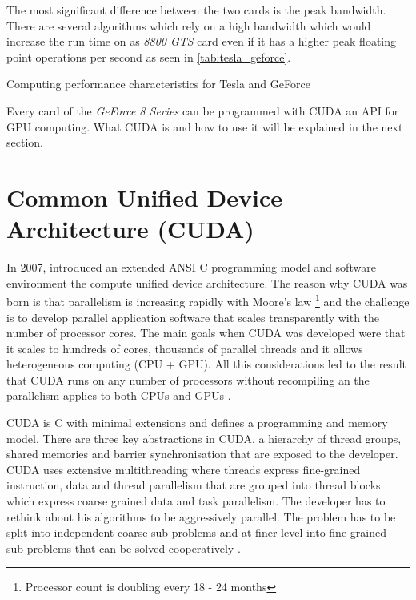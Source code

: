 The most significant difference between the two cards is the peak bandwidth. There
are several algorithms which rely on a high bandwidth which would increase the
run time on as \emph{8800 GTS} card even if it has a higher peak floating
point operations per second as seen in  \autoref{tab:tesla_geforce}. 

\begin{table}[ht]
	\centering
  	\caption{Computing performance characteristics for Tesla and GeForce}
  	\label{tab:tesla_geforce}
\end{table}

Every card of the \emph{GeForce 8 Series} can be programmed with \gls{CUDA} an
\gls{API} for \gls{GPU} computing. What \gls{CUDA} is and how to use it will 
be explained in the next section. 


\section{Common Unified Device Architecture (CUDA)}%
\label{sub:common_unified_device_architecture_cuda_} 
In 2007, {} introduced an extended \gls{ANSI} C programming model and
software environment the compute unified device architecture. The reason why
\gls{CUDA} was born is that parallelism is increasing rapidly with Moore's law
\footnote{Processor count is doubling every 18 - 24 months} and the challenge is
to develop parallel application software that scales transparently with the
number of processor cores. The main goals when \gls{CUDA} was developed were
that it scales to hundreds of cores, thousands of parallel threads and it allows
heterogeneous computing (\gls{CPU} + \gls{GPU}). All this considerations led to
the result that \gls{CUDA} runs on any number of processors without recompiling
an the parallelism applies to both \glspl{CPU} and \glspl{GPU} 
\citep{citeulike:3839013}.

\Gls{CUDA} is C with minimal extensions and defines a programming and memory model.
There are three key abstractions in \gls{CUDA}, a hierarchy of thread groups, shared
memories and barrier synchronisation \citep{citeulike:3325943} that are exposed
to the developer. \Gls{CUDA} uses extensive multithreading where threads express
fine-grained instruction, data and thread parallelism that are grouped into
thread blocks which express coarse grained data and task parallelism. The
developer has to rethink about his algorithms to be aggressively parallel.
The problem has to be split into independent coarse sub-problems and at finer
level into fine-grained sub-problems that can be solved cooperatively
\citep{citeulike:3325943}.

